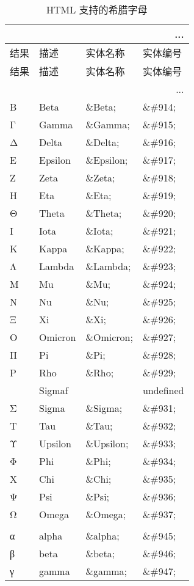 \begin{longtable}{|l|l|l|l|}
\multicolumn{4}{r}{...}
\tabularnewline\hline
结果		&描述	&实体名称	&实体编号
\endhead
\caption{HTML 支持的希腊字母}\\
\hline
结果		&描述	&实体名称	&实体编号
\tabularnewline\hline
\endfirsthead

\multicolumn{4}{r}{...}
\endfoot

\endlastfoot
\hline
Α	&Alpha	&\&Alpha;	&\&\#913;\\
\hline
Β	&Beta	&\&Beta;		&\&\#914;\\
\hline
Γ	&Gamma	&\&Gamma;	&\&\#915;\\
\hline
Δ	&Delta	&\&Delta;	&\&\#916;\\
\hline
Ε	&Epsilon	&\&Epsilon;	&\&\#917;\\
\hline
Ζ	&Zeta	&\&Zeta;		&\&\#918;\\
\hline
Η	&Eta	&\&Eta;		&\&\#919;\\
\hline
Θ	&Theta	&\&Theta;	&\&\#920;\\
\hline
Ι	&Iota	&\&Iota;		&\&\#921;\\
\hline
Κ	&Kappa	&\&Kappa;	&\&\#922;\\
\hline
Λ	&Lambda	&\&Lambda;	&\&\#923;\\
\hline
Μ	&Mu		&\&Mu;		&\&\#924;\\
\hline
Ν	&Nu		&\&Nu;		&\&\#925;\\
\hline
Ξ	&Xi		&\&Xi;		&\&\#926;\\
\hline
Ο	&Omicron&\&Omicron;	&\&\#927;\\
\hline
Π	&Pi		&\&Pi;		&\&\#928;\\
\hline
Ρ	&Rho	&\&Rho;		&\&\#929;\\
\hline
 	&Sigmaf	& 			&undefined\\
\hline
Σ	&Sigma	&\&Sigma;	&\&\#931;\\
\hline
Τ	&Tau	&\&Tau;		&\&\#932;\\
\hline
Υ	&Upsilon	&\&Upsilon;	&\&\#933;\\
\hline
Φ	&Phi		&\&Phi;		&\&\#934;\\
\hline
Χ	&Chi	&\&Chi;		&\&\#935;\\
\hline
Ψ	&Psi		&\&Psi;		&\&\#936;\\
\hline
Ω	&Omega	&\&Omega;	&\&\#937;\\
\hline
 \multicolumn{4}{|l|}{}				\\
\hline
α	&alpha	&\&alpha;	&\&\#945;\\
\hline
β	&beta	&\&beta;		&\&\#946;\\
\hline
γ	&gamma	&\&gamma;	&\&\#947;\\

\end{longtable}
